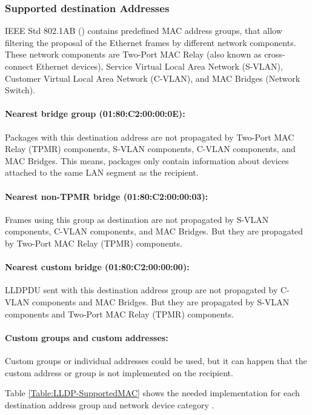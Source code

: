 \subsubsection{Supported destination Addresses}
\label{Section:LLDP-SupportedDestinationAddresses}

IEEE Std 802.1AB (\cite{IEEE:LLDP:2016}) contains predefined MAC address groups, that allow filtering the proposal of the Ethernet frames by different network components. These network components are Two-Port MAC Relay (also known as cross-connect Ethernet devices), Service Virtual Local Area Network (S-VLAN), Customer Virtual Local Area Network (C-VLAN), and MAC Bridges (Network Switch).

\paragraph{Nearest bridge group (01:80:C2:00:00:0E):} Packages with this destination address are not propagated by Two-Port MAC Relay (TPMR) components, S-VLAN components, C-VLAN components, and MAC Bridges. This means, packages only contain information about devices attached to the same LAN segment as the recipient.

\paragraph{Nearest non-TPMR bridge (01:80:C2:00:00:03):} Frames using this group as destination are not propagated by S-VLAN components, C-VLAN components, and MAC Bridges. But they are propagated by Two-Port MAC Relay (TPMR) components.

\paragraph{Nearest custom bridge (01:80:C2:00:00:00):} LLDPDU sent with this destination address group are not propagated by C-VLAN components and MAC Bridges. But they are propagated by S-VLAN components and Two-Port MAC Relay (TPMR) components.

\paragraph{Custom groups and custom addresses:} Custom groups or individual addresses could be used, but it can happen that the custom address or group is not implemented on the recipient.

Table \ref{Table:LLDP-SupportedMAC} shows the needed implementation for each destination address group and network device category \cite{IEEE:LLDP:2016}.

